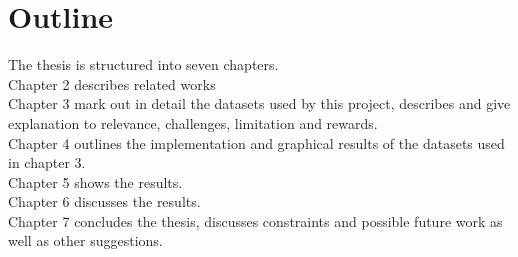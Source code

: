 \section{Outline}
The thesis is structured into seven chapters.
\newline \\Chapter 2 describes related works 
\newline \\Chapter 3 mark out in detail the datasets used by this project, describes and give explanation to relevance, challenges, limitation and rewards.
\newline \\Chapter 4 outlines the implementation and graphical results of the datasets used in chapter 3.
\newline \\Chapter 5 shows the results.
\newline \\Chapter 6 discusses the results.
\newline \\Chapter 7 concludes the thesis, discusses constraints and possible future work as well as other suggestions.